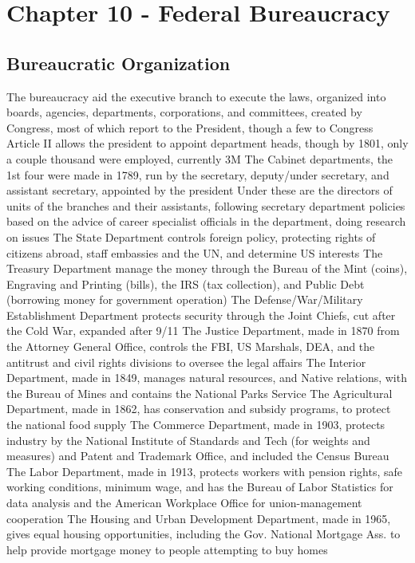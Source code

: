 \documentclass[11 pt, twoside]{article}
\newenvironment{outline*}
{
	\begin{outline}[enumerate]
	}
	{\end{outline}
}
\begin{document}
\section{Chapter 10 - Federal Bureaucracy}
\subsection{Bureaucratic Organization}
\begin{outline*}
\1 The bureaucracy aid the executive branch to execute the laws, organized into boards, agencies, departments, corporations, and committees, created by Congress, most of which report to the President, though a few to Congress
\2 Article II allows the president to appoint department heads, though by 1801, only a couple thousand were employed, currently 3M
\1 The Cabinet departments, the 1st four were made in 1789, run by the secretary, deputy/under secretary, and assistant secretary, appointed by the president
\2 Under these are the directors of units of the branches and their assistants, following secretary department policies based on the advice of career specialist officials in the department, doing research on issues
\2 The State Department controls foreign policy, protecting rights of citizens abroad, staff embassies and the UN, and determine US interests
\2 The Treasury Department manage the money through the Bureau of the Mint (coins), Engraving and Printing (bills), the IRS (tax collection), and Public Debt (borrowing money for government operation)
\2 The Defense/War/Military Establishment Department protects security through the Joint Chiefs, cut after the Cold War, expanded after 9/11
\2 The Justice Department, made in 1870 from the Attorney General Office, controls the FBI, US Marshals, DEA, and the antitrust and civil rights divisions to oversee the legal affairs
\2 The Interior Department, made in 1849, manages natural resources, and Native relations, with the Bureau of Mines and contains the National Parks Service
\2 The Agricultural Department, made in 1862, has conservation and subsidy programs, to protect the national food supply
\2 The Commerce Department, made in 1903, protects industry by the National Institute of Standards and Tech (for weights and measures) and Patent and Trademark Office, and included the Census Bureau
\2 The Labor Department, made in 1913, protects workers with pension rights, safe working conditions, minimum wage, and has the Bureau of Labor Statistics for data analysis and the American Workplace Office for union-management cooperation
\2 The Housing and Urban Development Department, made in 1965, gives equal housing opportunities, including the Gov. National Mortgage Ass. to help provide mortgage money to people attempting to buy homes

\end{outline*}
\end{document}
